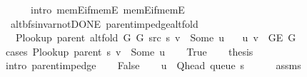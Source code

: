\begin{isabellebody}
\ \ \ \ \ \ intro{\isacharcolon}{\kern0pt}\ mem{\isacharunderscore}{\kern0pt}E{\isacharunderscore}{\kern0pt}if{\isacharunderscore}{\kern0pt}mem{\isacharunderscore}{\kern0pt}E{}\ mem{\isacharunderscore}{\kern0pt}E{\isacharunderscore}{\kern0pt}if{\isacharunderscore}{\kern0pt}mem{\isacharunderscore}{\kern0pt}E{}{\isacharparenright}{\kern0pt}%
\endisatagproof
{\isafoldproof}%
%
\isadelimproof
\isanewline
%
\endisadelimproof
\isanewline
{}\isamarkupfalse%
\ {\isacharparenleft}{\kern0pt}\ alt{\isacharunderscore}{\kern0pt}bfs{\isacharunderscore}{\kern0pt}invar{\isacharunderscore}{\kern0pt}not{\isacharunderscore}{\kern0pt}DONE{\isacharparenright}{\kern0pt}\ parent{\isacharunderscore}{\kern0pt}imp{\isacharunderscore}{\kern0pt}edge{\isacharunderscore}{\kern0pt}alt{\isacharunderscore}{\kern0pt}fold{\isacharcolon}{\kern0pt}\isanewline
\ \ \ {\isachardoublequoteopen}P{\isacharunderscore}{\kern0pt}lookup\ {\isacharparenleft}{\kern0pt}parent\ {\isacharparenleft}{\kern0pt}alt{\isacharunderscore}{\kern0pt}fold\ G{}\ G{}\ src\ s{\isacharparenright}{\kern0pt}{\isacharparenright}{\kern0pt}\ v\ {\isacharequal}{\kern0pt}\ Some\ u{\isachardoublequoteclose}\isanewline
\ \ \ {\isachardoublequoteopen}{\isacharbraceleft}{\kern0pt}u{\isacharcomma}{\kern0pt}\ v{\isacharbraceright}{\kern0pt}\ {\isasymin}\ G{\isachardot}{\kern0pt}E\ G{\isachardoublequoteclose}\isanewline
%
\isadelimproof
%
\endisadelimproof
%
\isatagproof
{}\isamarkupfalse%
\ {\isacharparenleft}{\kern0pt}cases\ {\isachardoublequoteopen}P{\isacharunderscore}{\kern0pt}lookup\ {\isacharparenleft}{\kern0pt}parent\ s{\isacharparenright}{\kern0pt}\ v\ {\isacharequal}{\kern0pt}\ Some\ u{\isachardoublequoteclose}{\isacharparenright}{\kern0pt}\isanewline
\ \ \isamarkupfalse%
\ True\isanewline
\ \ \isamarkupfalse%
\ {\isacharquery}{\kern0pt}thesis\isanewline
\ \ \ \ \isamarkupfalse%
\ {\isacharparenleft}{\kern0pt}intro\ parent{\isacharunderscore}{\kern0pt}imp{\isacharunderscore}{\kern0pt}edge{\isacharparenright}{\kern0pt}\isanewline
{}\isamarkupfalse%
\isanewline
\ \ \isamarkupfalse%
\ False\isanewline
\ \ \isamarkupfalse%
\ {\isachardoublequoteopen}u\ {\isacharequal}{\kern0pt}\ Q{\isacharunderscore}{\kern0pt}head\ {\isacharparenleft}{\kern0pt}queue\ s{\isacharparenright}{\kern0pt}{\isachardoublequoteclose}\isanewline
\ \ \ \ \isamarkupfalse%
\ assms\isanewline
\ \ \ \ \isamarkupfalse%

\end{isabellebody}

